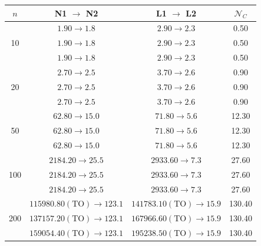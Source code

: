   \begin{table}[h] \centering
        \begin{tabular}{c|c|c|c}
            \toprule
            $n$ & N1 $\rightarrow$ N2 & L1 $\rightarrow$ L2 & $\mathcal{N}_C$ \\
            \midrule

            \multirow{3}{*}{10}
                & $1.90 \rightarrow 1.8$ & $2.90 \rightarrow 2.3$ & 0.50 \\
                & $1.90 \rightarrow 1.8$ & $2.90 \rightarrow 2.3$ & 0.50 \\
                & $1.90 \rightarrow 1.8$ & $2.90 \rightarrow 2.3$ & 0.50 \\

            \cmidrule(lr){1-4}

            \multirow{3}{*}{20}
                & $2.70 \rightarrow 2.5$ & $3.70 \rightarrow 2.6$ & 0.90 \\
                & $2.70 \rightarrow 2.5$ & $3.70 \rightarrow 2.6$ & 0.90 \\
                & $2.70 \rightarrow 2.5$ & $3.70 \rightarrow 2.6$ & 0.90 \\

            \cmidrule(lr){1-4}

            \multirow{3}{*}{50}
                & $62.80 \rightarrow 15.0$ & $71.80 \rightarrow 5.6$ & 12.30 \\
                & $62.80 \rightarrow 15.0$ & $71.80 \rightarrow 5.6$ & 12.30 \\
                & $62.80 \rightarrow 15.0$ & $71.80 \rightarrow 5.6$ & 12.30 \\

            \cmidrule(lr){1-4}

            \multirow{3}{*}{100}
                & $2184.20 \rightarrow 25.5$ & $2933.60 \rightarrow 7.3$ & 27.60 \\
                & $2184.20 \rightarrow 25.5$ & $2933.60 \rightarrow 7.3$ & 27.60 \\
                & $2184.20 \rightarrow 25.5$ & $2933.60 \rightarrow 7.3$ & 27.60 \\

            \cmidrule(lr){1-4}

            \multirow{3}{*}{200}
                & $115980.80(\mathrm{TO}) \rightarrow 123.1$ & $141783.10(\mathrm{TO}) \rightarrow 15.9$ & 130.40 \\
                & $137157.20(\mathrm{TO}) \rightarrow 123.1$ & $167966.60(\mathrm{TO}) \rightarrow 15.9$ & 130.40 \\
                & $159054.40(\mathrm{TO}) \rightarrow 123.1$ & $195238.50(\mathrm{TO}) \rightarrow 15.9$ & 130.40 \\


\end{tabular}
\end{table}
